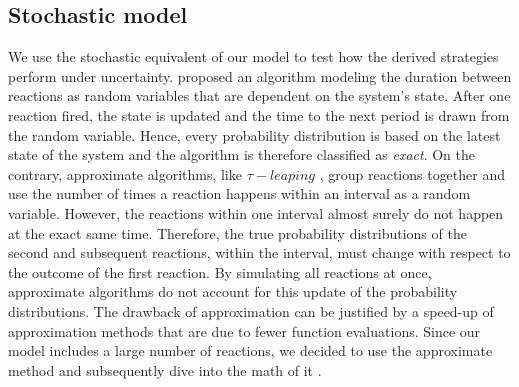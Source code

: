 \subsection{Stochastic model}
\label{sec:stochastic}
We use the stochastic equivalent of our model to test how the derived strategies perform under uncertainty. \cite{Gillespie.1977} proposed an algorithm modeling the duration between reactions as random variables that are dependent on the system's state. After one reaction fired, the state is updated and the time to the next period is drawn from the random variable. Hence, every probability distribution is based on the latest state of the system and the algorithm is therefore classified as \textit{exact}.  
On the contrary, approximate algorithms, like $\tau-leaping$ \citep{Gillespie.2001}, group reactions together and use the number of times a reaction happens within an interval as a random variable. However, the reactions within one interval almost surely do not happen at the exact same time. Therefore, the true probability distributions of the second and subsequent reactions, within the interval, must change with respect to the outcome of the first reaction. By simulating all reactions at once, approximate algorithms do not account for this update of the probability distributions. 
The drawback of approximation can be justified by a speed-up of approximation methods that are due to fewer function evaluations. Since our model includes a large number of reactions, we decided to use the approximate method and subsequently dive into the math of it \citep{Gillespie.2001}.\\


